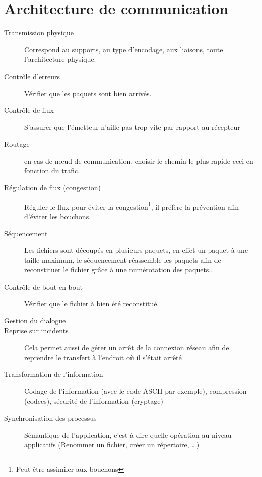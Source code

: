 \documentclass[12pt,a4paper,openany]{book}
\begin{document}
	\chapter{Architecture de communication}
		\begin{description}
			\item[Transmission physique] Correspond au supports, au type d'encodage, aux liaisons, toute l'architecture physique.
			\item[Contrôle d'erreurs]  Vérifier que les paquets sont bien arrivés.
			\item[Contrôle de flux]  S'assurer que l'émetteur n'aille pas trop vite par rapport au récepteur
			\item[Routage]  en cas de nœud de communication, choisir le chemin le plus rapide ceci en fonction du trafic. 
			\item[Régulation de flux (congestion)] Réguler le flux pour éviter la congestion\footnote{Peut être assimiler aux bouchons}, il préfère la prévention afin d'éviter les bouchons. 
			\item[Séquencement]  Les fichiers sont découpés en plusieurs paquets, en effet un paquet à une taille maximum, le séquencement réassemble les paquets afin de reconstituer le fichier grâce à une numérotation des paquets..
			\item[Contrôle de bout en bout] Vérifier que le fichier à bien été reconstitué. 
			\item[Gestion du dialogue] 
			\item[Reprise sur incidents]Cela permet aussi de gérer un arrêt de la connexion réseau afin de reprendre le transfert à l'endroit où il s'était arrêté
			\item[Transformation de l'information] Codage de l'information (avec le code ASCII par exemple), compression (codecs), sécurité de l'information (cryptage) 
			\item[Synchronisation des processus] Sémantique de l'application, c'est-à-dire quelle opération au niveau applicatifs (Renommer un fichier, créer un répertoire, \ldots)
		\end{description}
\end{document}
